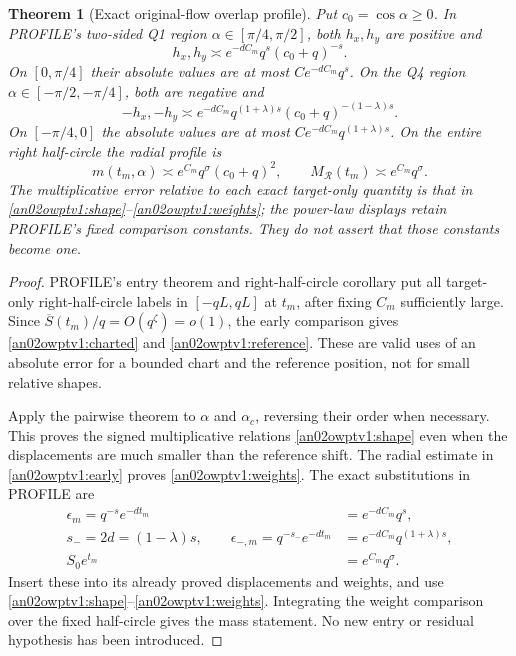 \documentclass[11pt]{article}
\newtheorem{theorem}{Theorem}[section]
\theoremstyle{remark}\newtheorem{remark}[theorem]{Remark}
\newcommand{\Rhalf}{\mathcal R}
\begin{document}
\begin{theorem}[Exact original-flow overlap profile]
Put $c_0=\cos\alpha\ge0$. In PROFILE's two-sided Q1 region
$\alpha\in[\pi/4,\pi/2]$, both $h_x,h_y$ are positive and
\begin{equation}\label{an02owptv1:q1profile}
 h_x,h_y\asymp e^{-dC_m}q^s(c_0+q)^{-s}.
\end{equation}
On $[0,\pi/4]$ their absolute values are at most
$C e^{-dC_m}q^s$. On the Q4 region
$\alpha\in[-\pi/2,-\pi/4]$, both are negative and
\begin{equation}\label{an02owptv1:q4profile}
 -h_x,-h_y\asymp
 e^{-dC_m}q^{(1+\lambda)s}(c_0+q)^{-(1-\lambda)s}.
\end{equation}
On $[-\pi/4,0]$ the absolute values are at most
$C e^{-dC_m}q^{(1+\lambda)s}$.
On the entire right half-circle the radial profile is
\begin{equation}\label{an02owptv1:radialprofile}
 m(t_m,\alpha)\asymp e^{C_m}q^\sigma(c_0+q)^2,
 \qquad M_{\Rhalf}(t_m)\asymp e^{C_m}q^\sigma.
\end{equation}
The multiplicative error relative to each exact target-only quantity
is that in \eqref{an02owptv1:shape}--\eqref{an02owptv1:weights};
the power-law displays retain PROFILE's fixed comparison constants.
They do not assert that those constants become one.
\end{theorem}
\begin{proof}
PROFILE's entry theorem and right-half-circle corollary put all
target-only right-half-circle labels in $[-qL,qL]$ at $t_m$, after
fixing $C_m$ sufficiently large. Since
$\overline S(t_m)/q=O(q^\zeta)=o(1)$, the early comparison gives
\eqref{an02owptv1:charted} and \eqref{an02owptv1:reference}.
These are valid uses of an absolute error for a bounded chart and
the reference position, not for small relative shapes.

Apply the pairwise theorem to $\alpha$ and $\alpha_c$, reversing
their order when necessary. This proves the signed multiplicative
relations \eqref{an02owptv1:shape} even when the displacements are
much smaller than the reference shift. The radial estimate in
\eqref{an02owptv1:early} proves \eqref{an02owptv1:weights}.
The exact substitutions in PROFILE are
\begin{align*}
 \epsilon_m=q^{-s}e^{-dt_m}&=e^{-dC_m}q^s,\\
 s_-=2d=(1-\lambda)s,\qquad
 \epsilon_{-,m}=q^{-s_-}e^{-dt_m}
 &=e^{-dC_m}q^{(1+\lambda)s},\\
 S_0e^{t_m}&=e^{C_m}q^\sigma.
\end{align*}
Insert these into its already proved displacements and weights,
and use \eqref{an02owptv1:shape}--\eqref{an02owptv1:weights}.
Integrating the weight comparison over the fixed half-circle gives
the mass statement. No new entry or residual hypothesis has been
introduced.
\end{proof}
\end{document}
